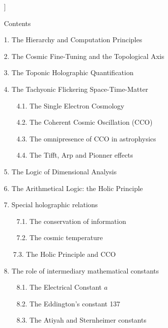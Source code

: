 \documentclass[twoside,draft]{article}
\begin{document}
\begin{sloppypar}
\begin{center}
{{%

}}\smallskip
\end{center}]{%


\setcounter{section}{0}
\setcounter{equation}{0}
\setcounter{figure}{0}
\setcounter{table}{0}
\setcounter{page}{1}


Contents

1. The Hierarchy and Computation Principles

2. The Cosmic Fine-Tuning and the Topological Axis

3. The Toponic Holographic Quantification

4. The Tachyonic Flickering Space-Time-Matter}

~~~   4.1. The Single Electron Cosmology
   
~~~    4.2. The Coherent Cosmic Oscillation (CCO)
   
~~~    4.3. The omnipresence of CCO in astrophysics
   
~~~    4.4. The Tifft, Arp and Pionner effects
   
5. The Logic of Dimensional Analysis

6. The Arithmetical Logic: the Holic Principle

7. Special holographic relations

~~~    7.1. The conservation of information
   
~~~    7.2. The cosmic temperature

~~     7.3. The Holic Principle and CCO 
    
8. The role of intermediary mathematical constants

~~~    8.1. The Electrical Constant $a$

~~~    8.2. The Eddington's constant 137
   
~~~    8.3. The Atiyah and Sternheimer constants
   

\end{sloppypar}
\end{document}

